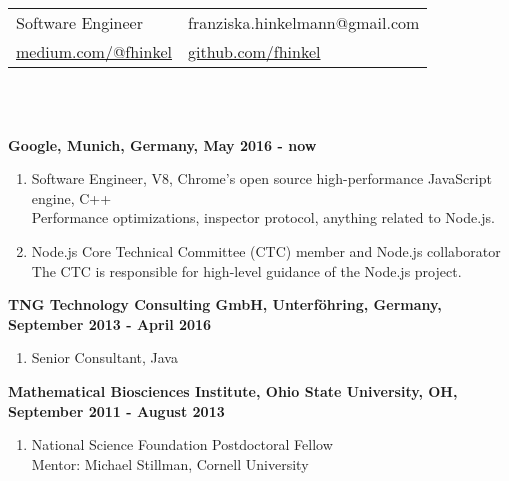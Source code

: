 \documentclass[10pt]{article}
\newcommand{\makeheading}[1]%
          {\hspace*{-\marginparsep minus \marginparwidth}%
           \begin{minipage}[t]{\textwidth+\marginparwidth+\marginparsep}%
                  {\large \bfseries #1}\\[-0.15\baselineskip]%
                   \rule{\columnwidth}{1pt}%
           \end{minipage}}
\renewcommand{\section}[2]%
          {\pagebreak[2]\vspace{1.3\baselineskip}%
           \phantomsection\addcontentsline{toc}{section}{#1}%
           \hspace{-.05in}%
  	\marginpar{\raggedright \scshape #1} #2}
\newenvironment{outerlist}[1][\enskip\textbullet]%
          {\begin{enumerate}[#1]}{\end{enumerate}%
           \vspace{-.6\baselineskip}}
\begin{document}
  \newlength{\rcollength}\setlength{\rcollength}{2.5in}%
  \begin{tabular}[t]{@{}p{\textwidth-\rcollength}p{\rcollength}}
  Software Engineer & 
  	franziska.hinkelmann@gmail.com\\
  \href{https://medium.com/@fhinkel}{medium.com/@fhinkel}
  & 
      \href{https://github.com/fhinkel}{github.com/fhinkel}
  \end{tabular}\\

  \begin{tabular*}{\textwidth}{c}
  \hline
  \end{tabular*}
  
  \section{} 
    \textbf{Google, Munich, Germany, May 2016 - now}
  \begin{outerlist}
  	\item[]
  	{Software Engineer, V8, Chrome's open source high-performance JavaScript engine, C++}\\
	Performance optimizations, inspector protocol, anything related to Node.js.
	\item[]
  	{Node.js Core Technical Committee (CTC) member and Node.js collaborator}\\
	The CTC is responsible for high-level guidance of the Node.js project.\\
    \end{outerlist}
    
  \textbf{TNG Technology Consulting GmbH, Unterf\"ohring, Germany, September 2013 - April 2016}
  \begin{outerlist}
  	\item[]
  	{Senior Consultant, Java}\\
    \end{outerlist}

  \textbf{Mathematical Biosciences Institute, Ohio
  State University, OH, September 2011 - August 2013}
  \begin{outerlist}
  	\item[]
  	{National Science Foundation Postdoctoral Fellow}\\
  	Mentor: Michael Stillman, Cornell University
  	\\
  \end{outerlist}
  \begin{tabular*}{\textwidth}{c}
  \hline
  \end{tabular*}
\end{document}
